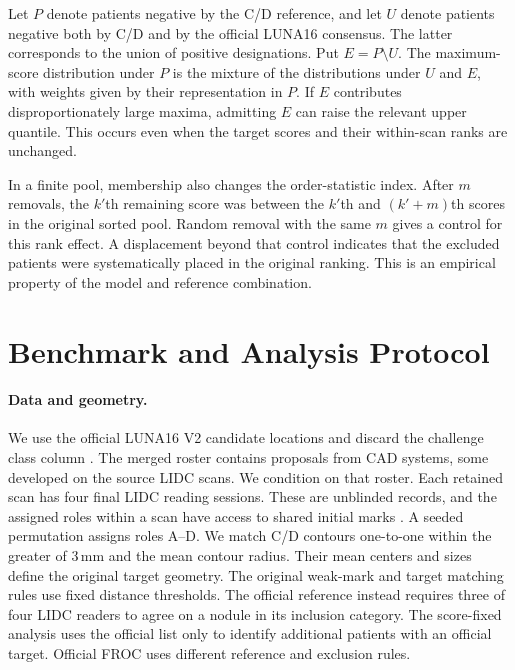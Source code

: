 Let $P$ denote patients negative by the C/D reference, and let $U$ denote patients negative both by C/D and by the official LUNA16 consensus. The latter corresponds to the union of positive designations. Put $E=P\setminus U$. The maximum-score distribution under $P$ is the mixture of the distributions under $U$ and $E$, with weights given by their representation in $P$. If $E$ contributes disproportionately large maxima, admitting $E$ can raise the relevant upper quantile. This occurs even when the target scores and their within-scan ranks are unchanged.

In a finite pool, membership also changes the order-statistic index. After $m$ removals, the $k'$th remaining score was between the $k'$th and $(k'+m)$th scores in the original sorted pool. Random removal with the same $m$ gives a control for this rank effect. A displacement beyond that control indicates that the excluded patients were systematically placed in the original ranking. This is an empirical property of the model and reference combination.

\section{Benchmark and Analysis Protocol}
\label{sec:benchmark}

\paragraph{Data and geometry.}
We use the official LUNA16 V2 candidate locations and discard the challenge class column \cite{setio2017,luna16v2}. The merged roster contains proposals from CAD systems, some developed on the source LIDC scans. We condition on that roster. Each retained scan has four final LIDC reading sessions. These are unblinded records, and the assigned roles within a scan have access to shared initial marks \cite{armato2011}. A seeded permutation assigns roles A--D. We match C/D contours one-to-one within the greater of 3\,mm and the mean contour radius. Their mean centers and sizes define the original target geometry. The original weak-mark and target matching rules use fixed distance thresholds. The official reference instead requires three of four LIDC readers to agree on a nodule in its inclusion category. The score-fixed analysis uses the official list only to identify additional patients with an official target. Official FROC uses different reference and exclusion rules.

